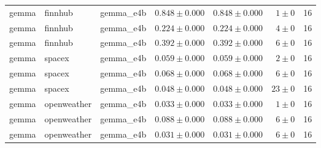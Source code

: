 \begin{table}[htbp]
\begin{tabular}{l l l r r r r}
gemma & finnhub & gemma\_e4b & $0.848\pm0.000$ & $0.848\pm0.000$ & $1\pm0$ & 16 \\
gemma & finnhub & gemma\_e4b & $0.224\pm0.000$ & $0.224\pm0.000$ & $4\pm0$ & 16 \\
gemma & finnhub & gemma\_e4b & $0.392\pm0.000$ & $0.392\pm0.000$ & $6\pm0$ & 16 \\
gemma & spacex & gemma\_e4b & $0.059\pm0.000$ & $0.059\pm0.000$ & $2\pm0$ & 16 \\
gemma & spacex & gemma\_e4b & $0.068\pm0.000$ & $0.068\pm0.000$ & $6\pm0$ & 16 \\
gemma & spacex & gemma\_e4b & $0.048\pm0.000$ & $0.048\pm0.000$ & $23\pm0$ & 16 \\
gemma & openweather & gemma\_e4b & $0.033\pm0.000$ & $0.033\pm0.000$ & $1\pm0$ & 16 \\
gemma & openweather & gemma\_e4b & $0.088\pm0.000$ & $0.088\pm0.000$ & $6\pm0$ & 16 \\
gemma & openweather & gemma\_e4b & $0.031\pm0.000$ & $0.031\pm0.000$ & $6\pm0$ & 16 \\
\hline
\end{tabular}
\end{table}
